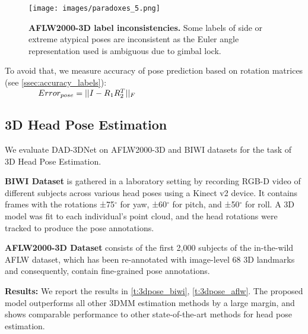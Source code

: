\documentclass[10pt,twocolumn,letterpaper]{article}
\begin{document}
\begin{figure}[t]\centering
\texttt{[image: images/paradoxes\_5.png]}

  \caption{\textbf{AFLW2000-3D label inconsistencies.} Some labels of side or extreme atypical poses are inconsistent as the Euler angle representation used is ambiguous due to gimbal lock.}
  \vspace{-1em}
  \label{fig:paradox}
\end{figure}


To avoid that, we measure accuracy of pose prediction based on rotation matrices \cite{rot_matrix_metrics} (see \cref{ssec:accuracy_labels}):\\
$\text{\quad\quad\quad\quad}Error_{pose} = ||I-R_1 R_2^{T}||_F$


\subsection{3D Head Pose Estimation}\label{ssec:3d_head_pose_estimation}

We evaluate DAD-3DNet on AFLW2000-3D and BIWI datasets for the task of 3D Head Pose Estimation.

\textbf{BIWI Dataset} \cite{BIWI} is gathered in a laboratory setting by recording RGB-D video of different subjects across various head poses using a Kinect v2 device. 
It contains frames with the rotations ±75$^{\circ}$ for yaw, ±60$^{\circ}$ for pitch, and ±50$^{\circ}$ for roll. 
A 3D model was fit to each individual's point cloud, and the head rotations were tracked to produce the pose annotations. 

\textbf{AFLW2000-3D Dataset}  \cite{AFLW2000-3D} consists of the first 2,000 subjects of the in-the-wild AFLW dataset, which has been re-annotated with image-level 68 3D landmarks
and consequently, contain fine-grained pose annotations. 

\textbf{Results:} We report the results in \cref{t:3dpose_biwi}, \cref{t:3dpose_aflw}.
The proposed model outperforms all other 3DMM estimation methods by a large margin, and shows comparable performance to other state-of-the-art methods for head pose estimation. 
\end{document}
